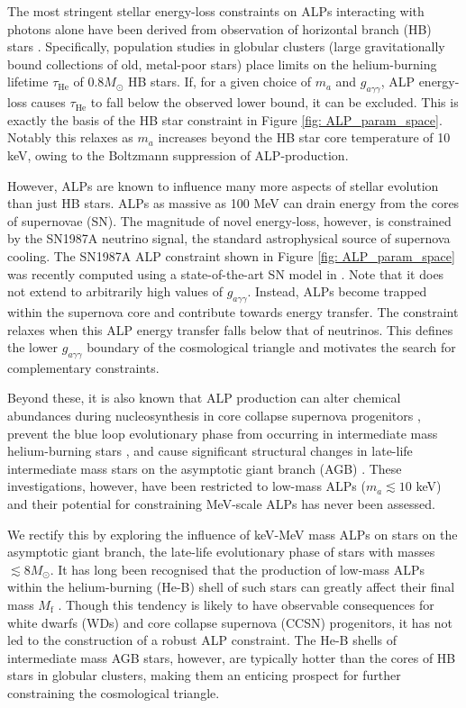 The most stringent stellar energy-loss constraints on ALPs interacting with photons alone have been derived from observation of horizontal branch (HB) stars \cite{Raffelt-Bounds-on-light, Raffelt:1996wa, Cadamuro:2011fd, Ayala:2014pea, Carenza:2020zil}. Specifically, population studies in globular clusters (large gravitationally bound collections of old, metal-poor stars) place limits on the helium-burning lifetime $\tau_{\mathrm{He}}$ of $0.8M_{\odot}$ HB stars. If, for a given choice of $m_a$ and $g_{a\gamma\gamma}$, ALP energy-loss causes $\tau_{\mathrm{He}}$ to fall below the observed lower bound, it can be excluded. This is exactly the basis of the HB star constraint in Figure \ref{fig: ALP_param_space}. Notably this relaxes as $m_a$ increases beyond the HB star core temperature of 10 keV, owing to the Boltzmann suppression of ALP-production.


However, ALPs are known to influence many more aspects of stellar evolution than just HB stars. ALPs as massive as 100 MeV can drain energy from the cores of supernovae (SN). The magnitude of novel energy-loss, however, is constrained by the SN1987A neutrino signal, the standard astrophysical source of supernova cooling. The SN1987A ALP constraint shown in Figure \ref{fig: ALP_param_space} was recently computed using a state-of-the-art SN model in \cite{Lucente:2020whw}. Note that it does not extend to arbitrarily high values of $g_{a\gamma\gamma}$. Instead, ALPs become trapped within the supernova core and contribute towards energy transfer. The constraint relaxes when this ALP energy transfer falls below that of neutrinos. This defines the lower $g_{a\gamma\gamma}$ boundary of the cosmological triangle and motivates the search for complementary constraints.



Beyond these, it is also known that ALP production can alter chemical abundances during nucleosynthesis in core collapse supernova progenitors \cite{Aoyama:2015asa}, prevent the blue loop evolutionary phase from occurring in intermediate mass helium-burning stars \cite{Friedland:2012hj}, and cause significant structural changes in late-life intermediate mass stars on the asymptotic giant branch (AGB) \cite{Dominguez, Dominguez:2017mia}. These investigations, however, have been restricted to low-mass ALPs ($m_a\lesssim10$ keV) and their potential for constraining MeV-scale ALPs has never been assessed. 


We rectify this by exploring the influence of keV-MeV mass ALPs on stars on the asymptotic giant branch, the late-life evolutionary phase of stars with masses $\lesssim8M_{\odot}$. It has long been recognised that the production of low-mass ALPs within the helium-burning (He-B) shell of such stars can greatly affect their final mass $M_\mathrm{f}$ \cite{Dominguez}. Though this tendency is likely to have observable consequences for white dwarfs (WDs) and core collapse supernova (CCSN) progenitors, it has not led to the construction of a robust ALP constraint. The He-B shells of intermediate mass AGB stars, however, are typically hotter than the cores of HB stars in globular clusters, making them an enticing prospect for further constraining the cosmological triangle.





